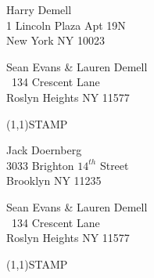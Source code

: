 \documentclass[12pt]{article}
\begin{document}
\begin{center} \begin{Huge} \vspace*{\fill}
Harry Demell\\
1 Lincoln Plaza Apt 19N\\
New York NY 10023\\
\vspace{\fill} \end{Huge} \end{center}

\clearpage

\begin{minipage}{.5\linewidth} \noindent
Sean Evans \& Lauren Demell\\\ 
134 Crescent Lane\\ 
Roslyn Heights NY 11577
\end{minipage}
\begin{minipage}{.5\linewidth \hspace{-.2in} \vspace{-.3in}}
\begin{flushright}
\framebox(1,1){STAMP}
\end{flushright}
\end{minipage}

\begin{center} \begin{Huge} \vspace*{\fill}
Jack Doernberg\\
3033 Brighton $14^{th}$ Street\\
Brooklyn NY 11235\\
\vspace{\fill} \end{Huge} \end{center}

\clearpage

\begin{minipage}{.5\linewidth} \noindent
Sean Evans \& Lauren Demell\\\ 
134 Crescent Lane\\ 
Roslyn Heights NY 11577
\end{minipage}
\begin{minipage}{.5\linewidth \hspace{-.2in} \vspace{-.3in}}
\begin{flushright}
\framebox(1,1){STAMP}
\end{flushright}
\end{minipage}
\end{document}
